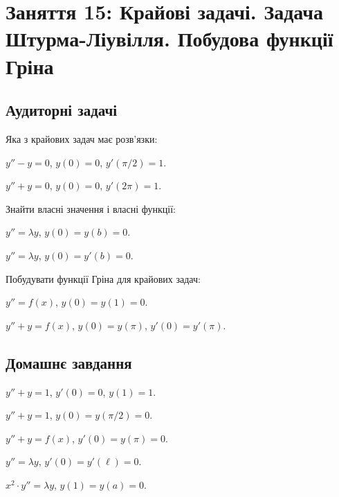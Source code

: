 \section*{Заняття 15: Крайові задачі. Задача Штурма-Ліувілля. Побудова функції Гріна}

\subsection*{Аудиторні задачі}

Яка з крайових задач має розв'язки:

\begin{problem}
	$y'' - y = 0$, $y(0) = 0$, $y'(\pi / 2) = 1$.
\end{problem}

\begin{problem}
	$y'' + y = 0$, $y(0) = 0$, $y'(2 \pi) = 1$.
\end{problem}

Знайти власні значення і власні функції:

\begin{problem}
		$y'' = \lambda y$, $y(0) = y(b) = 0$.
\end{problem}

\begin{problem}
	$y'' = \lambda y$, $y(0) = y'(b) = 0$.
\end{problem}

Побудувати функції Гріна для крайових задач:

\begin{problem}
	$y'' = f(x)$, $y(0) = y(1) = 0$.
\end{problem}

\begin{problem}
	$y'' + y = f(x)$, $y(0) = y(\pi)$, $y'(0) = y'(\pi)$.
\end{problem}

\subsection*{Домашнє завдання}

\begin{problem}
	$y'' + y = 1$, $y'(0) = 0$, $y(1) = 1$.
\end{problem}

\begin{problem}
	$y'' + y = 1$, $y(0) = y (\pi / 2) = 0$.
\end{problem}

\begin{problem}
	$y'' + y = f(x)$, $y'(0) = y (\pi) = 0$.
\end{problem}

\begin{problem}
	$y'' = \lambda y$, $y'(0) = y'(\ell) = 0$.
\end{problem}

\begin{problem}
	$x^2 \cdot y'' = \lambda y$, $y(1) = y(a) = 0$.
\end{problem}
